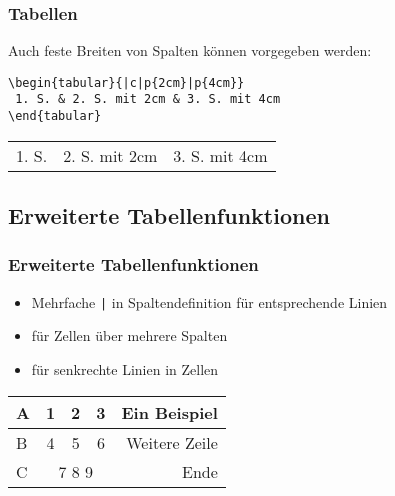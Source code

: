 \begin{frame}[fragile]
\frametitle{Tabellen}
Auch feste Breiten von Spalten können vorgegeben werden:
\begin{codeblock}
\begin{verbatim}
\begin{tabular}{|c|p{2cm}|p{4cm}}
 1. S. & 2. S. mit 2cm & 3. S. mit 4cm
\end{tabular}
\end{verbatim}
\end{codeblock}
\pause\bigskip

    \begin{tabular}{|c|p{2cm}|p{4cm}}
      1. S. & 2. S. mit 2cm & 3. S. mit 4cm
    \end{tabular}
\end{frame}

\subsection{Erweiterte Tabellenfunktionen}
\begin{frame}[fragile]
\frametitle{Erweiterte Tabellenfunktionen}
\begin{itemize}
    \item Mehrfache \verb+|+ in Spaltendefinition für entsprechende Linien
    \item {} für Zellen über mehrere Spalten
    \item {} für senkrechte Linien in Zellen
\end{itemize}
\pause
\bigskip

  \begin{tabular}{|l||c|c|c||r|}
    \hline
    A & 1 & 2 & 3 & Ein \vline Beispiel \\\hline
    B & 4 & 5 & 6 & Weitere Zeile \\\hline \hline
    C & \multicolumn{3}{c||}{7 8 9} & Ende \\\hline
  \end{tabular}
\end{frame}

